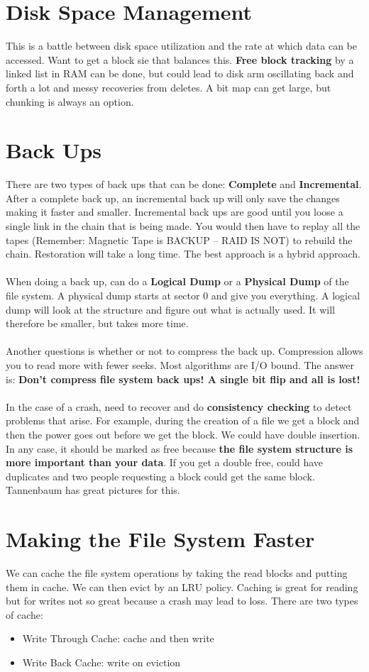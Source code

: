 \documentclass[../base_file/cs1550_notes.tex]{subfiles}
\begin{document}
\section{Disk Space Management}
This is a battle between disk space utilization and the rate at which data can
be accessed.  Want to get a block sie that balances this.  \textbf{Free block
tracking} by a linked list in RAM can be done, but could lead to disk arm
oscillating back and forth a lot and messy recoveries from deletes.  A bit map
can get large, but chunking is always an option.
\section{Back Ups}
There are two types of back ups that can be done: \textbf{Complete} and \textbf{
Incremental}.  After a complete back up, an incremental back up will only save
the changes making it faster and smaller.  Incremental back ups are good
until you loose a single link in the chain that is being made.  You would then
have to replay all the tapes (Remember: Magnetic Tape is BACKUP -- RAID IS NOT) to
rebuild the chain.  Restoration will take a long time.  The best approach is a hybrid
approach.\\\\
When doing a back up, can do a \textbf{Logical Dump} or a \textbf{Physical Dump} of the
file system.  A physical dump starts at sector 0 and give you everything.  A logical
dump will look at the structure and figure out what is actually used.  It will therefore
be smaller, but takes more time.\\\\
Another questions is whether or not to compress the back up.  Compression allows you to
read more with fewer seeks.  Most algorithms are I/O bound.  The answer is: 
\textbf{Don't compress file system back ups! A single bit flip and all is lost!}\\\\
In the case of a crash, need to recover and do \textbf{consistency checking} to 
detect problems that arise.  For example, during the creation of a file we get a block
and then the power goes out before we get the block.  We could have double insertion.
In any case, it should be marked as free because \textbf{the file system structure
is more important than your data}.  If you get a double free, could have duplicates
and two people requesting a block could get the same block.  Tannenbaum has great
pictures for this.
\section{Making the File System Faster}
We can cache the file system operations by taking the read blocks and putting them
in cache.  We can then evict by an LRU policy.  Caching is great for reading but
for writes not so great because a crash may lead to loss.  There are two types
of cache:
\begin{itemize}
	\item Write Through Cache: cache and then write
	\item Write Back Cache: write on eviction
\end{itemize}
\end{document}
